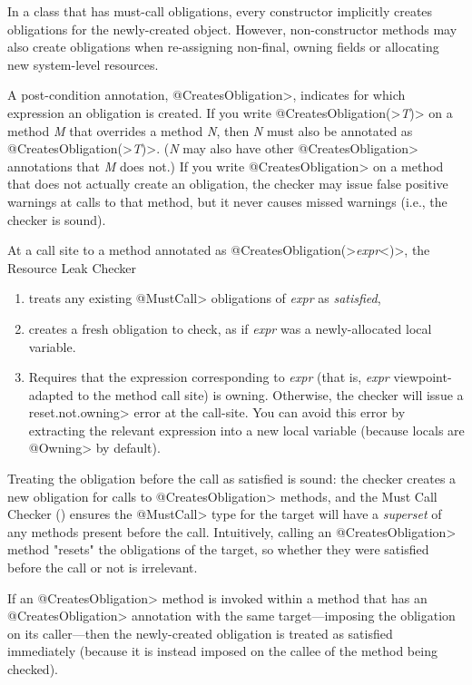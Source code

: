 In a class that has must-call obligations,
every constructor implicitly creates obligations for the newly-created object.
However, non-constructor methods may also create obligations
when re-assigning non-final, owning fields or allocating
new system-level resources.

A post-condition annotation,
\<@CreatesObligation>,
indicates for which expression an obligation is created.
If you write \<@CreatesObligation(>\emph{T}\<)> on a method \emph{M} that
overrides a method \emph{N}, then \emph{N} must also be annotated as
\<@CreatesObligation(>\emph{T}\<)>.  (\emph{N} may also have other
\<@CreatesObligation> annotations that \emph{M} does not.)
If you write \<@CreatesObligation> on a method that does not actually
create an obligation, the checker may issue false positive warnings at calls to
that method, but it never causes
missed warnings (i.e., the checker is sound).

At a call site to a method annotated as
\<@CreatesObligation(>\emph{expr}<)>, the Resource Leak Checker
\begin{enumerate}
\item
  treats any existing \<@MustCall> obligations of \emph{expr} as \emph{satisfied},
\item
  creates a fresh obligation to check, as if \emph{expr} was a newly-allocated local
  variable.
\item
  Requires that the expression corresponding to \emph{expr} (that is, \emph{expr}
  viewpoint-adapted to the method call site) is owning.  Otherwise, the checker
  will issue a \<reset.not.owning> error at the call-site. You can avoid this
  error by extracting the relevant expression into a new local variable (because
  locals are \<@Owning> by default).
\end{enumerate}

Treating the obligation before the call as satisfied is sound: the
checker creates a new obligation for calls to \<@CreatesObligation> methods,
and the Must Call Checker () ensures the
\<@MustCall> type for the target will have a \emph{superset} of any methods
present before the call. Intuitively, calling an \<@CreatesObligation> method
"resets" the obligations of the target, so whether they were satisfied before
the call or not is irrelevant.

If an \<@CreatesObligation>
method is invoked within a method that has an \<@CreatesObligation> annotation
with the same target---imposing the obligation on its caller---then
the newly-created obligation is treated as satisfied immediately (because it is instead imposed
on the callee of the method being checked).

